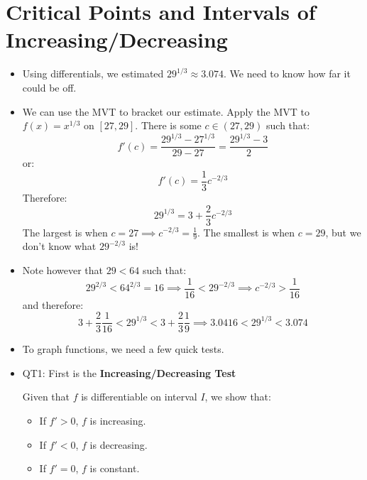 \section{Critical Points and Intervals of Increasing/Decreasing}
\begin{itemize}
    \item Using differentials, we estimated $29^{1/3} \approx 3.074$. We need to know how far it could be off.
    \item We can use the MVT to bracket our estimate. Apply the MVT to $f(x)=x^{1/3}$ on $[27,29]$. There is some $c \in (27,29)$ such that:
    \begin{equation}
        f'(c)=\frac{29^{1/3}-27^{1/3}}{29-27}=\frac{29^{1/3}-3}{2}
        \label{eq:}
    \end{equation}
    or:
    \begin{equation}
        f'(c)=\frac{1}{3}c^{-2/3}
        \label{eq:}
    \end{equation}
    Therefore:
    \begin{equation}
        29^{1/3}=3+\frac{2}{3}c^{-2/3}
        \label{eq:}
    \end{equation}
    The largest is when $c=27 \implies c^{-2/3}=\frac{1}{9}$. The smallest is when $c=29$, but we don't know what $29^{-2/3}$ is!
    \item Note however that $29<64$ such that:
    \begin{equation}
        29^{2/3} < 64^{2/3} = 16 \implies \frac{1}{16} < 29^{-2/3} \implies c^{-2/3} > \frac{1}{16}
        \label{eq:}
    \end{equation}
    and therefore:
    \begin{equation}
        3+\frac{2}{3}\frac{1}{16} < 29^{1/3} < 3+\frac{2}{3}\frac{1}{9} \implies 3.0416 < 29^{1/3} < 3.074
        \label{eq:}
    \end{equation}
    \item To graph functions, we need a few quick tests.
    \item QT1: First is the \textbf{Increasing/Decreasing Test}
    \begin{idea}
        Given that $f$ is differentiable on interval $I$, we show that:
    \begin{itemize}
        \item If $f'>0$, $f$ is increasing.
        \item If $f'<0$, $f$ is decreasing.
        \item If $f'=0$, $f$ is constant.
    \end{itemize}

\end{idea}
\end{itemize}

